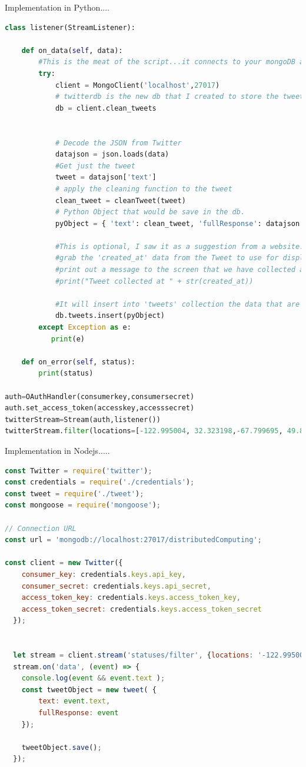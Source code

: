 \documentclass{article}
\begin{document}
        Implementation in Python....
        \begin{lstlisting}[language=Python, caption= Python Implementation, label={lst:PythonImplementation}]
            class listener(StreamListener):

    def on_data(self, data):
        #This is the meat of the script...it connects to your mongoDB and stores the tweet
        try:
            client = MongoClient('localhost',27017)
            # twitterdb is the new db that I created to store the tweets
            db = client.clean_tweets

            
            # Decode the JSON from Twitter
            datajson = json.loads(data)
            #Get just the tweet
            tweet = datajson['text']
            # apply the cleaning function to the tweet
            clean_tweet = cleanTweet(tweet)
            # Python Object that would be save in the db.
            pyObject = { 'text': clean_tweet, 'fullResponse': datajson }  

            #This is optional, I saw it as a suggestion from a website.
            #grab the 'created_at' data from the Tweet to use for display
            #print out a message to the screen that we have collected a tweet
            #print("Tweet collected at " + str(created_at))

            #It will insert into 'tweets' collection the data that are streamed
            db.tweets.insert(pyObject)
        except Exception as e:
           print(e)

    def on_error(self, status):
        print(status)

auth=OAuthHandler(consumerkey,consumersecret)
auth.set_access_token(accesskey,accesssecret)
twitterStream=Stream(auth,listener())
twitterStream.filter(locations=[-122.995004, 32.323198,-67.799695, 49.893813])

        \end{lstlisting}


        Implementation in Nodejs.....
\begin{lstlisting}[language=Javascript, caption= JAvascript Implementation, label={lst:JavascriptImplementation}]        
        const Twitter = require('twitter');
const credentials = require('./credentials');
const tweet = require('./tweet');
const mongoose = require('mongoose');

// Connection URL
const url = 'mongodb://localhost:27017/distributedComputing';

const client = new Twitter({
    consumer_key: credentials.keys.api_key,
    consumer_secret: credentials.keys.api_secret,
    access_token_key: credentials.keys.access_token_key,
    access_token_secret: credentials.keys.access_token_secret
  });


  let stream = client.stream('statuses/filter', {locations: '-122.995004, 32.323198, -67.799695, 49.893813'});
  stream.on('data', (event) => {
    console.log(event && event.text );
    const tweetObject = new tweet( {
        text: event.text,
        fullResponse: event
    });

    tweetObject.save();
  });
          \end{lstlisting}
\end{document}
